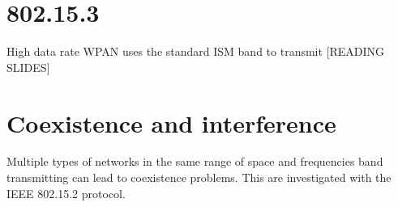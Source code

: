 \section{802.15.3}

High data rate WPAN uses the standard ISM band to transmit [READING SLIDES]


\section{Coexistence and interference}
Multiple types of networks in the same range of space and frequencies band transmitting can lead to coexistence problems. This are investigated with the IEEE 802.15.2 protocol.
